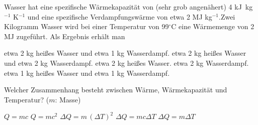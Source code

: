 \documentclass[11pt]{exam}
\begin{document}
\begin{questions}
\vspace{3mm}\question Wasser hat eine spezifische Wärmekapazität von (sehr grob angenähert) 4 kJ kg\(^{-1}\) K\(^{-1}\) und eine spezifische Verdampfungswärme von etwa 2 MJ kg\(^{-1}\).Zwei Kilogramm Wasser wird bei einer Temperatur von 99\(^\circ\)C eine Wärmemenge von 2 MJ zugeführt. Als Ergebnis erhält man

\begin{choices}
	\choice etwa 2 kg heißes Wasser und etwa 1 kg Wasserdampf.
	\choice etwa 2 kg heißes Wasser und etwa 2 kg Wasserdampf.
	\choice etwa 2 kg heißes Wasser.
	\choice etwa 2 kg Wasserdampf.
	\choice etwa 1 kg heißes Wasser und etwa 1 kg Wasserdampf.
\end{choices}

\vspace{3mm}\question Welcher Zusammenhang besteht zwischen Wärme, Wärmekapazität und Temperatur? (\(m\): Masse)

\begin{choices}
	\choice \(Q = m c\)
	\choice \(Q = m c^2\)
	\choice \(\Delta Q = m \, (\Delta T)^2\)
	\choice \(\Delta Q = m c \Delta T\)
	\choice \(\Delta Q = m \Delta T\)
\end{choices}

\vspace{3mm}\end{questions}
\end{document}
